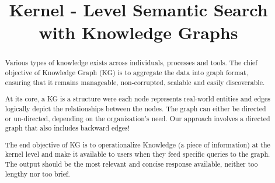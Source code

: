\documentclass[conference]{IEEEtran}
\begin{document}
\title{ Kernel - Level Semantic Search with Knowledge Graphs
}

\author{\IEEEauthorblockN{}
\and
{}
\and
{}
\and
{}
}

\maketitle

\begin{abstract}
Various types of knowledge exists across individuals, processes and tools.
The chief objective of Knowledge Graph (KG) is to aggregate the data into graph format, ensuring that it remains manageable, non-corrupted, scalable and easily discoverable.

At its core, a KG is a structure were each node represents real-world entities and edges logically depict the relationships between the nodes. The graph can either be directed or un-directed, depending on the organization's need. Our approach involves a directed graph that also includes backward edges!

The end objective of KG is to operationalize Knowledge (a piece of information) at the kernel level and make it available to users when they feed specific queries to the graph. The output should be the most relevant and concise response available, neither too lengthy nor too brief.
\end{abstract}

\end{document}
